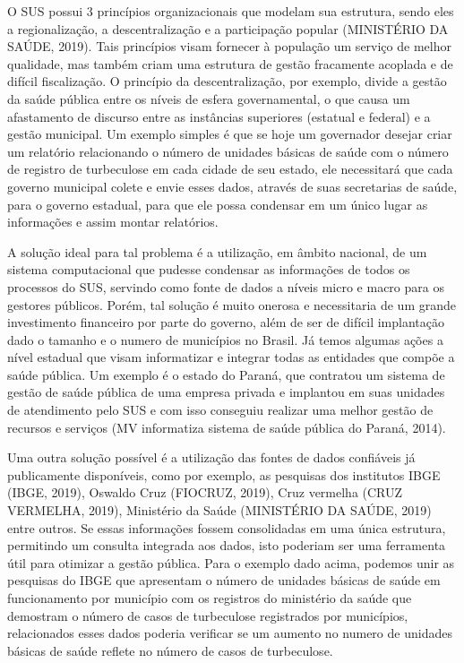 \documentclass[
	12pt,				%
	openright,			%
	oneside,			%
	a4paper,			%
	chapter=TITLE,		%
	section=TITLE,		%
	subsection=TITLE,	%
	subsubsection=TITLE,%
	english,			%
	brazil				%
	]{abntex2}
\theoremstyle{definition}
\begin{document}
    O SUS possui 3 princípios organizacionais que modelam sua estrutura, sendo eles a regionalização, a descentralização e a participação popular (MINISTÉRIO DA SAÚDE, 2019). Tais princípios visam fornecer à população um serviço de melhor qualidade, mas também criam uma estrutura de gestão fracamente acoplada e de difícil fiscalização. O princípio da descentralização, por exemplo, divide a gestão da saúde pública entre os níveis de esfera governamental, o que causa um afastamento de discurso entre as instâncias superiores (estatual e federal) e a gestão municipal. Um exemplo simples é que se hoje um governador desejar criar um relatório relacionando o número de unidades básicas de saúde com o número de registro de turbeculose em cada cidade de seu estado,  ele necessitará que cada governo municipal colete e envie esses dados, através de suas secretarias de saúde, para o governo estadual, para que ele possa condensar em um único lugar as informações e assim montar relatórios. 
    
    A solução ideal para tal problema é a utilização, em âmbito nacional, de um sistema computacional que pudesse condensar as informações de todos os processos do SUS, servindo como fonte de dados a níveis micro e macro para os gestores públicos. Porém, tal solução é muito onerosa e necessitaria de um grande investimento financeiro por parte do governo, além de ser de difícil implantação dado o tamanho e o numero de municípios no Brasil. Já temos algumas ações a nível estadual que visam informatizar e integrar todas as entidades que compõe a saúde pública. Um exemplo é o estado do Paraná, que contratou um sistema de gestão de saúde pública de uma empresa privada e implantou em suas unidades de atendimento pelo SUS e com isso conseguiu realizar uma melhor gestão de recursos e serviços (MV informatiza sistema de saúde pública do Paraná, 2014).

    Uma outra solução possível é a utilização das fontes de dados confiáveis já publicamente disponíveis, como por exemplo, as pesquisas dos institutos IBGE (IBGE, 2019), Oswaldo Cruz (FIOCRUZ, 2019), Cruz vermelha (CRUZ VERMELHA, 2019), Ministério da Saúde (MINISTÉRIO DA SAÚDE, 2019) entre outros. Se essas informações fossem consolidadas em uma única estrutura, permitindo um consulta integrada aos dados, isto poderiam ser uma ferramenta útil para otimizar a gestão pública. Para o exemplo dado acima, podemos unir as pesquisas do IBGE que apresentam o número de unidades básicas de saúde em funcionamento por município com os registros do ministério da saúde que demostram o número de casos de turbeculose registrados por municípios, relacionados esses dados poderia verificar se um aumento no numero de unidades básicas de saúde reflete no número de casos de turbeculose. 
    
\end{document}
